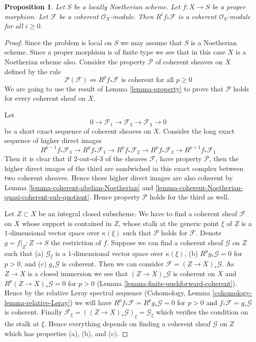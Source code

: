 \documentclass{stacks-project}
\newenvironment{reference}{\comment}{\endcomment}
\theoremstyle{plain}
\newtheorem{proposition}[subsection]{Proposition}
\theoremstyle{definition}
\theoremstyle{remark}
\numberwithin{equation}{subsection}
\begin{document}
\begin{proposition}
\label{proposition-proper-pushforward-coherent}
\begin{reference}
\cite[III Theorem 3.2.1]{EGA}
\end{reference}
Let $S$ be a locally Noetherian scheme.
Let $f : X \to S$ be a proper morphism.
Let $\mathcal{F}$ be a coherent $\mathcal{O}_X$-module.
Then $R^if_*\mathcal{F}$ is a coherent $\mathcal{O}_S$-module
for all $i \geq 0$.
\end{proposition}

\begin{proof}
Since the problem is local on $S$ we may assume that $S$ is
a Noetherian scheme. Since a proper morphism is of finite type
we see that in this case $X$ is a Noetherian scheme also.
Consider the property $\mathcal{P}$ of coherent sheaves
on $X$ defined by the rule
$$
\mathcal{P}(\mathcal{F}) \Leftrightarrow
R^pf_*\mathcal{F}\text{ is coherent for all }p \geq 0
$$
We are going to use the result of
Lemma \ref{lemma-property} to prove that
$\mathcal{P}$ holds for every coherent sheaf on $X$.

\medskip\noindent
Let
$$
0 \to \mathcal{F}_1 \to \mathcal{F}_2 \to \mathcal{F}_3 \to 0
$$
be a short exact sequence of coherent sheaves on $X$.
Consider the long exact sequence of higher direct images
$$
R^{p - 1}f_*\mathcal{F}_3 \to
R^pf_*\mathcal{F}_1 \to
R^pf_*\mathcal{F}_2 \to
R^pf_*\mathcal{F}_3 \to
R^{p + 1}f_*\mathcal{F}_1
$$
Then it is clear that if 2-out-of-3 of the sheaves $\mathcal{F}_i$
have property $\mathcal{P}$, then the higher direct images of the
third are sandwiched in this exact complex between two coherent
sheaves. Hence these higher direct images are also coherent by
Lemma \ref{lemma-coherent-abelian-Noetherian} and
\ref{lemma-coherent-Noetherian-quasi-coherent-sub-quotient}.
Hence property $\mathcal{P}$ holds for the third as well.

\medskip\noindent
Let $Z \subset X$ be an integral closed subscheme.
We have to find a coherent sheaf $\mathcal{F}$ on $X$ whose support is
contained in $Z$, whose stalk at the generic point $\xi$ of $Z$ is a
$1$-dimensional vector space over $\kappa(\xi)$ such that $\mathcal{P}$
holds for $\mathcal{F}$. Denote $g = f|_Z : Z \to S$ the restriction of $f$.
Suppose we can find a coherent sheaf $\mathcal{G}$ on $Z$ such
that
(a) $\mathcal{G}_\xi$ is a $1$-dimensional vector space over $\kappa(\xi)$,
(b) $R^pg_*\mathcal{G} = 0$ for $p > 0$, and
(c) $g_*\mathcal{G}$ is coherent. Then we can consider
$\mathcal{F} = (Z \to X)_*\mathcal{G}$. As $Z \to X$ is a closed immersion
we see that $(Z \to X)_*\mathcal{G}$ is coherent on $X$
and $R^p(Z \to X)_*\mathcal{G} = 0$ for $p > 0$
(Lemma \ref{lemma-finite-pushforward-coherent}).
Hence by the relative Leray spectral sequence
(Cohomology, Lemma \ref{cohomology-lemma-relative-Leray})
we will have $R^pf_*\mathcal{F} = R^pg_*\mathcal{G} = 0$ for $p > 0$
and $f_*\mathcal{F} = g_*\mathcal{G}$ is coherent.
Finally $\mathcal{F}_\xi = ((Z \to X)_*\mathcal{G})_\xi = \mathcal{G}_\xi$
which verifies the condition on the stalk at $\xi$.
Hence everything depends on finding a coherent sheaf $\mathcal{G}$
on $Z$ which has properties (a), (b), and (c).


\end{proof}
\end{document}
